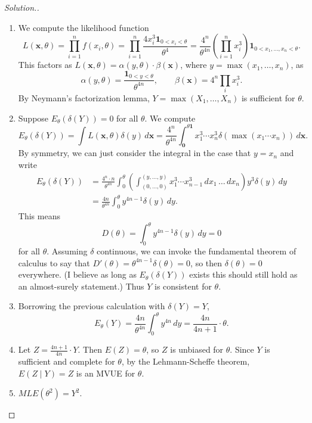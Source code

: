 \documentclass{article}
\renewcommand{\vec}[1]{\mathbf{#1}}
\begin{document}
\begin{proof}[Solution.] 
\begin{enumerate}[label=(\alph*)]
\item We compute the likelihood function
\begin{equation*}
L(\vec{x},\theta) = \prod_{i = 1}^n f(x_i,\theta) = \prod_{i = 1}^n \frac{4x_i^3\vec{1}_{0 < x_i < \theta}}{\theta^4} = \frac{4^n}{\theta^{4n}}\left(\prod_{i = 1}^n x_i^3\right)\vec{1}_{0 < x_1, \ldots, x_n < \theta}.
\end{equation*}
This factors as $L(\vec{x},\theta) = \alpha(y,\theta)\cdot\beta(\vec{x})$, where $y = \max(x_1, \ldots, x_n)$, as
\begin{equation*}
\alpha(y,\theta) = \frac{\vec{1}_{0 < y < \theta}}{\theta^{4n}},\qquad\beta(\vec{x}) = 4^n\prod_i x_i^3.
\end{equation*}
By Neymann's factorization lemma, $Y = \max(X_1, \ldots, X_n)$ is sufficient for $\theta$.
\item Suppose $E_{\theta}(\delta(Y)) = 0$ for all $\theta$. We compute
\begin{equation*}
E_{\theta}(\delta(Y)) = \int L(\vec{x},\theta)\delta(y)\,d\vec{x} = \frac{4^n}{\theta^{4n}}\int_{\vec{0}}^{\theta\vec{1}} x_1^3\cdots x_n^3\delta(\max(x_1\cdots x_n))\,d\vec{x}.
\end{equation*}
By symmetry, we can just consider the integral in the case that $y = x_n$ and write
\begin{align*}
E_{\theta}(\delta(Y)) &= \frac{4^n\cdot n}{\theta^{4n}}\int_0^{\theta}\left(\int_{(0,\ldots,0)}^{(y,\ldots,y)} x_1^3\cdots x_{n - 1}^3\,dx_1\,\ldots\,dx_n\right)y^3\delta(y)\,dy \\
&= \frac{4n}{\theta^{4n}}\int_0^{\theta} y^{4n - 1}\delta(y)\,dy.
\end{align*}
This means
\begin{equation*}
D(\theta) = \int_0^{\theta} y^{4n - 1}\delta(y)\,dy = 0
\end{equation*}
for all $\theta$. Assuming $\delta$ continuous, we can invoke the fundamental theorem of calculus to say that $D'(\theta) = \theta^{4n - 1}\delta(\theta) = 0$, so then $\delta(\theta) = 0$ everywhere. (I believe as long as $E_{\theta}(\delta(Y))$ exists this should still hold as an almost-surely statement.) Thus $Y$ is consistent for $\theta$.
\item Borrowing the previous calculation with $\delta(Y) = Y$,
\begin{equation*}
E_{\theta}(Y) = \frac{4n}{\theta^{4n}}\int_0^{\theta} y^{4n}\,dy = \frac{4n}{4n + 1}\cdot\theta.
\end{equation*}
\item Let $Z = \frac{4n + 1}{4n}\cdot Y$. Then $E(Z) = \theta$, so $Z$ is unbiased for $\theta$. Since $Y$ is sufficient and complete for $\theta$, by the Lehmann-Scheffe theorem, $E(Z\mid Y) = Z$ is an MVUE for $\theta$.
\item $MLE(\theta^2) = Y^2$.
\end{enumerate}
\end{proof}
\end{document}
